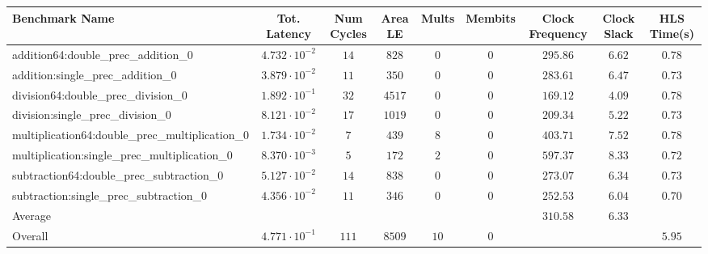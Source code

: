 \begin{tabular}{|l|c|c|c|c|c|c|c|c|}
\hline
Benchmark Name                                   & Tot. Latency            & Num Cycles & Area LE  & Mults  & Membits & Clock Frequency & Clock Slack & HLS Time(s) \\
\hline
addition64:double\_prec\_addition\_0             & $ 4.732 \cdot 10^{-2} $ & $ 14     $ & $ 828  $ & $ 0  $ & $ 0   $ & $ 295.86      $ & $ 6.62    $ & $ 0.78    $ \\
addition:single\_prec\_addition\_0               & $ 3.879 \cdot 10^{-2} $ & $ 11     $ & $ 350  $ & $ 0  $ & $ 0   $ & $ 283.61      $ & $ 6.47    $ & $ 0.73    $ \\
division64:double\_prec\_division\_0             & $ 1.892 \cdot 10^{-1} $ & $ 32     $ & $ 4517 $ & $ 0  $ & $ 0   $ & $ 169.12      $ & $ 4.09    $ & $ 0.78    $ \\
division:single\_prec\_division\_0               & $ 8.121 \cdot 10^{-2} $ & $ 17     $ & $ 1019 $ & $ 0  $ & $ 0   $ & $ 209.34      $ & $ 5.22    $ & $ 0.73    $ \\
multiplication64:double\_prec\_multiplication\_0 & $ 1.734 \cdot 10^{-2} $ & $ 7      $ & $ 439  $ & $ 8  $ & $ 0   $ & $ 403.71      $ & $ 7.52    $ & $ 0.78    $ \\
multiplication:single\_prec\_multiplication\_0   & $ 8.370 \cdot 10^{-3} $ & $ 5      $ & $ 172  $ & $ 2  $ & $ 0   $ & $ 597.37      $ & $ 8.33    $ & $ 0.72    $ \\
subtraction64:double\_prec\_subtraction\_0       & $ 5.127 \cdot 10^{-2} $ & $ 14     $ & $ 838  $ & $ 0  $ & $ 0   $ & $ 273.07      $ & $ 6.34    $ & $ 0.73    $ \\
subtraction:single\_prec\_subtraction\_0         & $ 4.356 \cdot 10^{-2} $ & $ 11     $ & $ 346  $ & $ 0  $ & $ 0   $ & $ 252.53      $ & $ 6.04    $ & $ 0.70    $ \\
\hline
Average                                          & $                     $ & $        $ & $      $ & $    $ & $     $ & $ 310.58      $ & $ 6.33    $ & $         $ \\
\hline
Overall                                          & $ 4.771 \cdot 10^{-1} $ & $ 111    $ & $ 8509 $ & $ 10 $ & $ 0   $ & $             $ & $         $ & $ 5.95    $ \\
\hline
\end{tabular}

